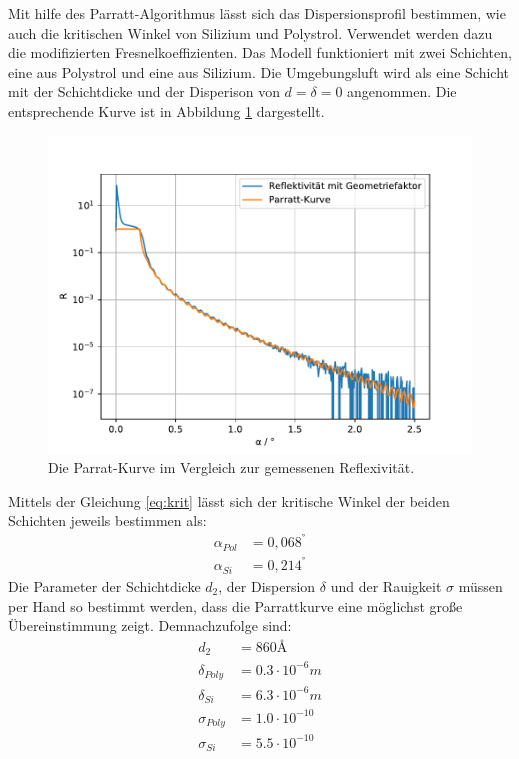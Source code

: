 Mit hilfe des Parratt-Algorithmus lässt sich das Dispersionsprofil bestimmen,
wie auch die kritischen Winkel von Silizium und Polystrol.
Verwendet werden dazu die modifizierten Fresnelkoeffizienten.
Das Modell funktioniert mit zwei Schichten, eine aus Polystrol und eine aus Silizium.
Die Umgebungsluft wird als eine Schicht mit der Schichtdicke und der Disperison von $d = \delta = 0$ angenommen.
Die entsprechende Kurve ist in Abbildung \ref{fig:parratt} dargestellt.
\begin{figure}[h]
    \centering
    \includegraphics[width = 1\textwidth]{Auswertung/Graphen/Parrat_Algorthmus.pdf}
    \caption{Die Parrat-Kurve im Vergleich zur gemessenen Reflexivität.}
    \label{fig:parratt}
\end{figure}
Mittels der Gleichung \eqref{eq:krit} lässt sich der kritische Winkel der beiden Schichten jeweils bestimmen als:
\begin{align}
    \alpha_{Pol} &= 0,068^° \\
    \alpha_{Si}  &= 0,214^°
\end{align}
Die Parameter der Schichtdicke $d_2$, der Dispersion $\delta$ und der Rauigkeit $\sigma$ müssen per Hand so bestimmt werden,
dass die Parrattkurve eine möglichst große Übereinstimmung zeigt.
Demnachzufolge sind:
\begin{align*} 
    d_2 &=  860 \text{\AA} \\
    \delta_{Poly} &= 0.3\cdot 10^{-6} m \\
    \delta_{Si} &= 6.3\cdot 10^{-6}  m\\
    \sigma_{Poly} &=  1.0\cdot 10^{-10}\\
    \sigma_{Si} &=  5.5\cdot 10^{-10}
\end{align*}
